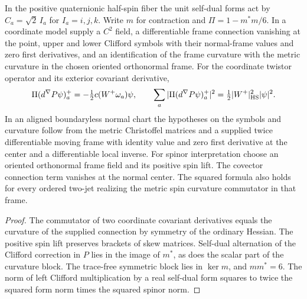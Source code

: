 \begin{proposition}
\label{prop:supplied-normal-spin-defect}
\leanok
In the positive quaternionic half-spin fiber the unit self-dual forms
act by $C_a=\sqrt{2}\,I_a$ for $I_a=i,j,k$. Write $m$ for contraction
and $\Pi=1-m^*m/6$. In a coordinate model supply a $C^2$ field, a
differentiable frame connection vanishing at the point, upper and lower
Clifford symbols with their normal-frame values and zero first derivatives,
and an identification of the frame curvature with the metric curvature
in the chosen oriented orthonormal frame. For the coordinate twistor
operator and its exterior covariant derivative,
\[
 \Pi(d^\nabla P\psi)^+_a=-\tfrac12 c(W^+\omega_a)\psi,
 \qquad
 \sum_a|\Pi(d^\nabla P\psi)^+_a|^2
   =\tfrac12|W^+|_{\rm HS}^2|\psi|^2 .
\]
In an aligned boundaryless normal chart the hypotheses on the symbols and
curvature follow from the metric Christoffel matrices and a supplied
twice differentiable moving frame with identity value and zero first
derivative at the center and a differentiable local inverse. For spinor
interpretation choose an oriented orthonormal frame field and its positive
spin lift. The covector connection term vanishes at the normal center.
The squared formula also holds for every ordered two-jet realizing
the metric spin curvature commutator in that frame.
\end{proposition}
\begin{proof}
\leanok
The commutator of two coordinate covariant derivatives equals the
curvature of the supplied connection by symmetry of the ordinary
Hessian. The positive spin lift preserves brackets of skew matrices.
Self-dual alternation of the Clifford correction in $P$ lies in the
image of $m^*$, as does the scalar part of the curvature block.
The trace-free symmetric block lies in $\ker m$, and $mm^*=6$.
The norm of left Clifford multiplication by a real self-dual form
squares to twice the squared form norm times the squared spinor norm.
\end{proof}

